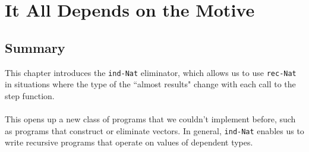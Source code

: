 \documentclass{article}
\newcommand{\ttt}[1]{\texttt{#1}}
\begin{document}
\section{It All Depends on the Motive}
\subsection{Summary}
This chapter introduces the \ttt{ind-Nat} eliminator, which allows us to use \ttt{rec-Nat} in situations where the type of the ``almost results" change with each call to the step function. 
\\ \\
This opens up a new class of programs that we couldn't implement before, such as programs that construct or eliminate vectors. In general, \ttt{ind-Nat} enables us to write recursive programs that operate on values of dependent types.
\end{document}
